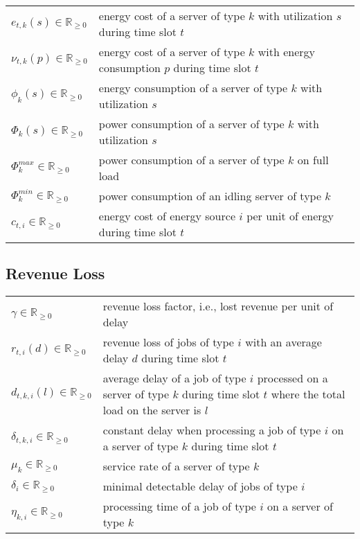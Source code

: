 \begin{tabularx}{\textwidth}{p{100pt}X}
    $e_{t,k}(s) \in \mathbb{R}_{\geq 0}$ & energy cost of a server of type $k$ with utilization $s$ during time slot $t$ \\
    $\nu_{t,k}(p) \in \mathbb{R}_{\geq 0}$ & energy cost of a server of type $k$ with energy consumption $p$ during time slot $t$ \\
    $\phi_k(s) \in \mathbb{R}_{\geq 0}$ & energy consumption of a server of type $k$ with utilization $s$ \\
    $\Phi_k(s) \in \mathbb{R}_{\geq 0}$ & power consumption of a server of type $k$ with utilization $s$ \\
    $\Phi_k^{max} \in \mathbb{R}_{\geq 0}$ & power consumption of a server of type $k$ on full load \\
    $\Phi_k^{min} \in \mathbb{R}_{\geq 0}$ & power consumption of an idling server of type $k$ \\
    $c_{t,i} \in \mathbb{R}_{\geq 0}$ & energy cost of energy source $i$ per unit of energy during time slot $t$ \\
\end{tabularx}

\subsection*{Revenue Loss}

\begin{tabularx}{\textwidth}{p{100pt}X}
    $\gamma \in \mathbb{R}_{\geq 0}$ & revenue loss factor, i.e., lost revenue per unit of delay \\
    $r_{t,i}(d) \in \mathbb{R}_{\geq 0}$ & revenue loss of jobs of type $i$ with an average delay $d$ during time slot $t$ \\
    $d_{t,k,i}(l) \in \mathbb{R}_{\geq 0}$ & average delay of a job of type $i$ processed on a server of type $k$ during time slot $t$ where the total load on the server is $l$ \\
    $\delta_{t,k,i} \in \mathbb{R}_{\geq 0}$ & constant delay when processing a job of type $i$ on a server of type $k$ during time slot $t$ \\
    $\mu_k \in \mathbb{R}_{\geq 0}$ & service rate of a server of type $k$ \\
    $\delta_i \in \mathbb{R}_{\geq 0}$ & minimal detectable delay of jobs of type $i$ \\
    $\eta_{k,i} \in \mathbb{R}_{\geq 0}$ & processing time of a job of type $i$ on a server of type $k$ \\
\end{tabularx}


